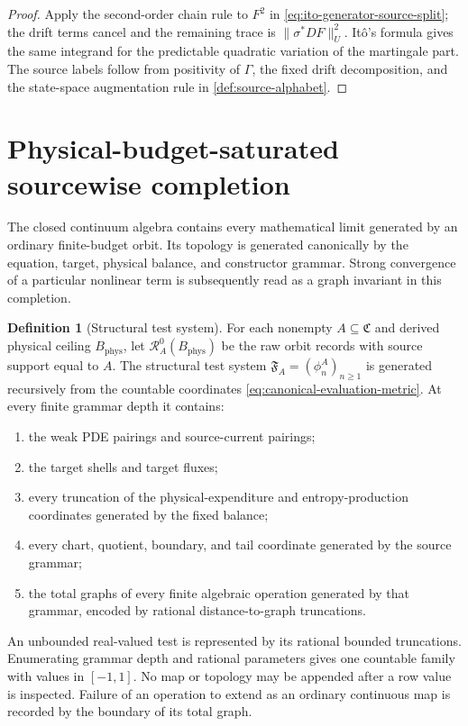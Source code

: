 \documentclass[11pt]{article}
\numberwithin{section}{part}
\theoremstyle{plain}
\theoremstyle{definition}
\newtheorem{definition}[definition]{Definition}
\theoremstyle{remark}
\newcommand{\Channels}{\mathfrak C}
\newcommand{\Records}{\mathscr R}
\newcommand{\Phys}{\mathrm{phys}}
\newcommand{\Budget}{B_{\Phys}}
\begin{document}
\begin{proof}
Apply the second-order chain rule to \(F^2\) in
\eqref{eq:ito-generator-source-split}; the drift terms cancel and the
remaining trace is \(\|\sigma^*DF\|_U^2\).  It\^o's formula gives the same
integrand for the predictable quadratic variation of the martingale part.
The source labels follow from positivity of \(\Gamma\), the fixed drift
decomposition, and the state-space augmentation rule in
\cref{def:source-alphabet}.
\end{proof}

\section{Physical-budget-saturated sourcewise completion}
\label{sec:sourcewise-completion}

The closed continuum algebra contains every mathematical limit generated by
an ordinary finite-budget orbit.  Its topology is generated canonically by the
equation, target, physical balance, and constructor grammar.  Strong
convergence of a particular nonlinear term is subsequently read as a graph
invariant in this completion.

\begin{definition}[Structural test system]
\label{def:structural-test-system}
For each nonempty \(A\subseteq\Channels\) and derived physical ceiling \(\Budget\),
let \(\Records_A^0(\Budget)\) be the raw orbit records with source support
equal to \(A\).  The structural test system
\(\mathfrak F_A=(\phi_n^A)_{n\ge1}\) is generated recursively from the
countable coordinates \eqref{eq:canonical-evaluation-metric}.  At every finite
grammar depth it contains:
\begin{enumerate}[label=\textup{(T\arabic*)}]
\item the weak PDE pairings and source-current pairings;
\item the target shells and target fluxes;
\item every truncation of the physical-expenditure and entropy-production
coordinates generated by the fixed balance;
\item every chart, quotient, boundary, and tail coordinate generated by the
source grammar;
\item the total graphs of every finite algebraic operation generated by that
grammar, encoded by rational distance-to-graph truncations.
\end{enumerate}
An unbounded real-valued test is represented by its rational bounded
truncations.  Enumerating grammar depth and rational parameters gives one
countable family with values in \([-1,1]\).  No map or topology may be appended
after a row value is inspected.  Failure of an operation to extend as an
ordinary continuous map is recorded by the boundary of its total graph.
\end{definition}
\end{document}
